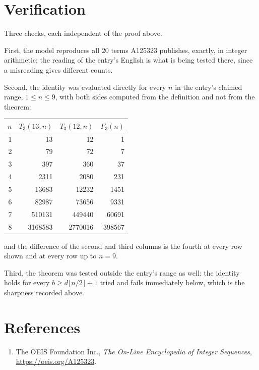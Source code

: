 \documentclass[11pt,a4paper]{article}
\theoremstyle{plain}
\theoremstyle{definition}
\begin{document}
\section{Verification}

Three checks, each independent of the proof above.

First, the model reproduces all $20$ terms A125323 publishes, exactly, in integer
arithmetic; the reading of the entry's English is what is being tested there, since a
misreading gives different counts.

Second, the identity was evaluated directly for every $n$ in the entry's claimed range,
$1\le n\le9$, with both sides computed from the definition and not from the theorem:

\begin{center}
\begin{tabular}{rrrr}
$n$ & $T_{3}(13,n)$ & $T_{3}(12,n)$ & $F_{3}(n)$ \\ \hline
1 & 13 & 12 & 1 \\
2 & 79 & 72 & 7 \\
3 & 397 & 360 & 37 \\
4 & 2311 & 2080 & 231 \\
5 & 13683 & 12232 & 1451 \\
6 & 82987 & 73656 & 9331 \\
7 & 510131 & 449440 & 60691 \\
8 & 3168583 & 2770016 & 398567 \\
\end{tabular}
\end{center}

\noindent and the difference of the second and third columns is the fourth at every row shown
and at every row up to $n=9$.

Third, the theorem was tested outside the entry's range as well: the identity holds for every
$b\ge d\lfloor n/2\rfloor+1$ tried and fails immediately below, which is the sharpness recorded
above.

\section*{References}
\begin{enumerate}
\item The OEIS Foundation Inc., \emph{The On-Line Encyclopedia of Integer Sequences},
\url{https://oeis.org/A125323}.
\end{enumerate}
\end{document}
